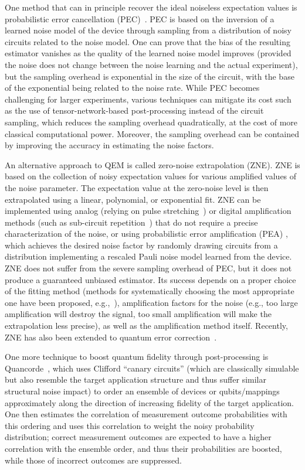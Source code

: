 One method that can in principle recover the ideal noiseless expectation values is probabilistic error cancellation (PEC)~\cite{vanderberg2023probabilistic}.
PEC is based on the inversion of a learned noise model of the device through sampling from a distribution of noisy circuits related to the noise model.
One can prove that the bias of the resulting estimator vanishes as the quality of the learned noise model improves (provided the noise does not change between the noise learning and the actual experiment), but the sampling overhead is exponential in the size of the circuit, with the base of the exponential being related to the noise rate.
While PEC becomes challenging for larger experiments, various techniques can mitigate its cost such as the use of tensor-network-based post-processing \cite{filippov2023scalable} instead of the circuit sampling, which reduces the sampling overhead quadratically, at the cost of more classical computational power. Moreover, the sampling overhead can be contained by improving the accuracy in estimating the noise factors.

An alternative approach to QEM is called zero-noise extrapolation (ZNE). ZNE is based on the collection of noisy expectation values for various amplified values of the noise parameter.
The expectation value at the zero-noise level is then extrapolated using a linear, polynomial, or exponential fit.
ZNE can be implemented using analog (relying on pulse stretching~\cite{kim2023scalable}) or digital amplification methods (such as sub-circuit repetition~\cite{shehab2019toward,giurgicatiron2020digital,majumdar2023best}) that do not require a precise characterization of the noise, or using probabilistic error amplification (PEA) \cite{kim2023evidence}, which achieves the desired noise factor by randomly drawing circuits from a distribution implementing a rescaled Pauli noise model learned from the device.
ZNE does not suffer from the severe sampling overhead of PEC, but it does not produce a guaranteed unbiased estimator.
Its success depends on a proper choice of the fitting method (methods for systematically choosing the most appropriate one have been proposed, e.g.,~\cite{majumdar2023best}), amplification factors for the noise (e.g., too large amplification will destroy the signal, too small amplification will make the extrapolation less precise), as well as the amplification method itself. Recently, ZNE has also been extended to quantum error correction~\cite{wahl2023zero}.

One more technique to boost quantum fidelity through post-processing is Quancorde~\cite{ravi2022boosting}, which uses Clifford ``canary circuits'' (which are classically simulable but also resemble the target application structure and thus suffer similar structural noise impact) to order an ensemble of devices or qubits/mappings approximately along the direction of increasing fidelity of the target application.
One then estimates the correlation of measurement outcome probabilities with this ordering and uses this correlation to weight the noisy probability distribution; correct measurement outcomes are expected to have a higher correlation with the ensemble order, and thus their probabilities are boosted, while those of incorrect outcomes are suppressed. 


